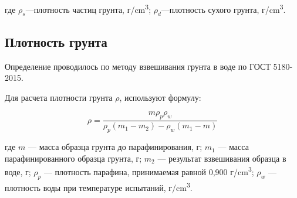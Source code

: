 где $\rho_s$---плотность частиц грунта, г/\si{\centi\meter^3};
$\rho_d$---плотность сухого грунта, г/\si{\centi\meter^3}.

\subsection{Плотность грунта}

Определение проводилось по методу взвешивания грунта в воде по ГОСТ 5180-2015. 

Для расчета плотности грунта  $\rho$,  используют формулу: 

\[
   \rho = \frac{m \rho_p \rho_w}{\rho_p (m_1-m_2)-\rho_w (m_1-m)}
\]

где $m$ --- масса образца грунта до парафинирования, г;
$m_1$ --- масса парафинированного образца грунта, г;
$m_2$ --- результат взвешивания образца в воде, г; 
$\rho_p$ --- плотность парафина, принимаемая равной 0,900 г/\si{\centi\meter^3};
$\rho_w$ --- плотность воды при температуре испытаний,  г/\si{\centi\meter^3}.


